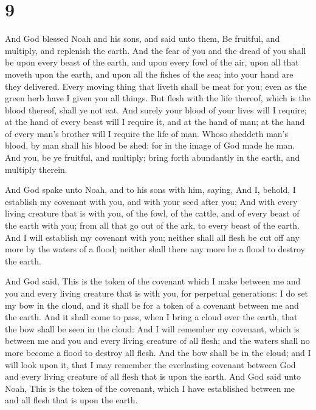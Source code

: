 \hypertarget{section-8}{%
\section{9}\label{section-8}}

 And God blessed Noah and his sons, and said unto them, Be
fruitful, and multiply, and replenish the earth.  And the
fear of you and the dread of you shall be upon every beast of the earth,
and upon every fowl of the air, upon all that moveth upon the earth, and
upon all the fishes of the sea; into your hand are they delivered.
 Every moving thing that liveth shall be meat for you; even
as the green herb have I given you all things.  But flesh
with the life thereof, which is the blood thereof, shall ye not eat.
 And surely your blood of your lives will I require; at the
hand of every beast will I require it, and at the hand of man; at the
hand of every man's brother will I require the life of man. 
Whoso sheddeth man's blood, by man shall his blood be shed: for in the
image of God made he man.  And you, be ye fruitful, and
multiply; bring forth abundantly in the earth, and multiply therein.

 And God spake unto Noah, and to his sons with him,
saying,  And I, behold, I establish my covenant with you,
and with your seed after you;  And with every living
creature that is with you, of the fowl, of the cattle, and of every
beast of the earth with you; from all that go out of the ark, to every
beast of the earth.  And I will establish my covenant with
you; neither shall all flesh be cut off any more by the waters of a
flood; neither shall there any more be a flood to destroy the earth.

 And God said, This is the token of the covenant which I
make between me and you and every living creature that is with you, for
perpetual generations:  I do set my bow in the cloud, and
it shall be for a token of a covenant between me and the earth.
 And it shall come to pass, when I bring a cloud over the
earth, that the bow shall be seen in the cloud:  And I will
remember my covenant, which is between me and you and every living
creature of all flesh; and the waters shall no more become a flood to
destroy all flesh.  And the bow shall be in the cloud; and
I will look upon it, that I may remember the everlasting covenant
between God and every living creature of all flesh that is upon the
earth.  And God said unto Noah, This is the token of the
covenant, which I have established between me and all flesh that is upon
the earth.

